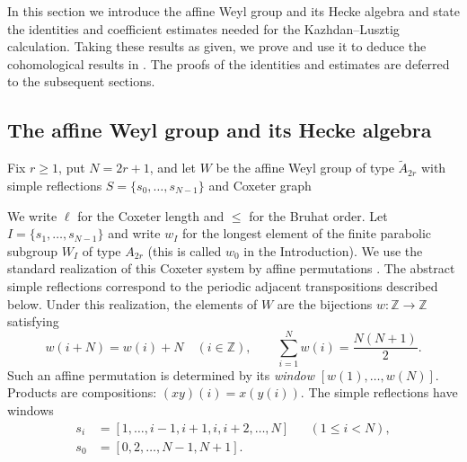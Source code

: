 \documentclass[11pt,a4paper,reqno]{amsart}
\numberwithin{equation}{section}
\theoremstyle{definition}
\newtheorem{definition}[theorem]{Definition}
\theoremstyle{remark}
\theoremstyle{plain}
\begin{document}
In this section we introduce the affine Weyl group and its Hecke
algebra and state the identities and coefficient estimates needed
for the Kazhdan--Lusztig calculation. Taking these results as given,
we prove  and use it to deduce the cohomological results
in . The proofs of the identities and
estimates are deferred to the subsequent sections.

\subsection{The affine Weyl group and its Hecke algebra}
Fix $r\geq1$, put $N=2r+1$, and let $W$ be the affine Weyl group
of type $\widetilde A_{2r}$ with simple reflections $S=\{s_0,\ldots,s_{N-1}\}$ and Coxeter graph
\begin{center}
\end{center}
We write $\ell$ for the Coxeter length and $\leq$ for the Bruhat order. Let $I=\{s_1,\ldots,s_{N-1}\}$ and write $w_I$ for the longest
element of the finite parabolic subgroup $W_I$ of type $A_{2r}$ (this is called $w_0$ in the Introduction).
%
We use the standard realization of this Coxeter system by affine
permutations \cite[Section~8.3]{BB}. The abstract simple reflections
correspond to the periodic adjacent transpositions described below.
% 
Under this realization, the elements of $W$ are the bijections
$w:\mathbb Z\to\mathbb Z$ satisfying
\[
 w(i+N)=w(i)+N\quad(i\in\mathbb Z),\qquad
 \sum_{i=1}^Nw(i)=\frac{N(N+1)}2.
\]
Such an affine permutation is determined by its \emph{window}
$[w(1),\ldots,w(N)]$. Products are compositions:
$(xy)(i)=x(y(i))$. The simple reflections have windows
\[
\begin{aligned}
 s_i&=[1,\ldots,i-1,i+1,i,i+2,\ldots,N] &&(1\leq i<N),\\
 s_0&=[0,2,\ldots,N-1,N+1].
\end{aligned}
\]
\end{document}
